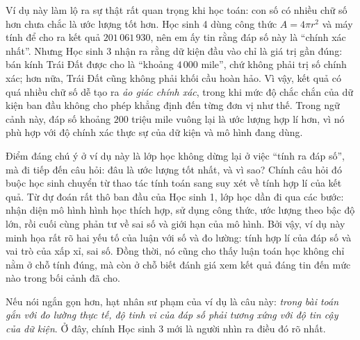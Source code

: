   {
    Ví dụ này làm lộ ra sự thật rất quan trọng khi học toán: con số có nhiều chữ số hơn chưa chắc là ước lượng tốt hơn. Học sinh 4 dùng công thức $A = 4\pi r^2$ và máy tính để cho ra kết quả $201\,061\,930$, nên em ấy tin rằng đáp số này là ``chính xác nhất''. Nhưng Học sinh 3 nhận ra rằng dữ kiện đầu vào chỉ là giá trị gần đúng: bán kính Trái Đất được cho là ``khoảng $4\,000$ mile'', chứ không phải trị số chính xác; hơn nữa, Trái Đất cũng không phải khối cầu hoàn hảo. Vì vậy, kết quả có quá nhiều chữ số dễ tạo ra \emph{ảo giác chính xác}, trong khi mức độ chắc chắn của dữ kiện ban đầu không cho phép khẳng định đến từng đơn vị như thế. Trong ngữ cảnh này, đáp số khoảng $200$ triệu mile vuông lại là ước lượng hợp lí hơn, vì nó phù hợp với độ chính xác thực sự của dữ kiện và mô hình đang dùng.

    Điểm đáng chú ý ở ví dụ này là lớp học không dừng lại ở việc ``tính ra đáp số'', mà đi tiếp đến câu hỏi: đâu là ước lượng tốt nhất, và vì sao? Chính câu hỏi đó buộc học sinh chuyển từ thao tác tính toán sang suy xét về tính hợp lí của kết quả. Từ dự đoán rất thô ban đầu của Học sinh 1, lớp học dần đi qua các bước: nhận diện mô hình hình học thích hợp, sử dụng công thức, ước lượng theo bậc độ lớn, rồi cuối cùng phản tư về sai số và giới hạn của mô hình. Bởi vậy, ví dụ này minh họa rất rõ hai yếu tố của luận với số và đo lường: tính hợp lí của đáp số và vai trò của xấp xỉ, sai số. Đồng thời, nó cũng cho thấy luận toán học không chỉ nằm ở chỗ tính đúng, mà còn ở chỗ biết đánh giá xem kết quả đáng tin đến mức nào trong bối cảnh đã cho.

    Nếu nói ngắn gọn hơn, hạt nhân sư phạm của ví dụ là câu này: \emph{trong bài toán gắn với đo lường thực tế, độ tinh vi của đáp số phải tương xứng với độ tin cậy của dữ kiện}. Ở đây, chính Học sinh 3 mới là người nhìn ra điều đó rõ nhất.
  }

